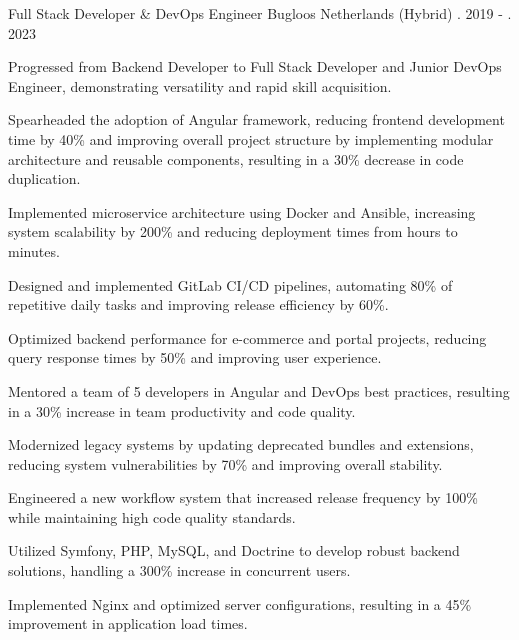 \begin{cventries}
    
  \cventry
    {Full Stack Developer \& DevOps Engineer} %
    {Bugloos} %
    {Netherlands (Hybrid)} %
    {\shortmonthname[08]. 2019 - \shortmonthname[08]. 2023} %
    {
      \begin{cvitems} %
        \item {Progressed from Backend Developer to Full Stack Developer and Junior DevOps Engineer, demonstrating versatility and rapid skill acquisition.}
        \item {Spearheaded the adoption of Angular framework, reducing frontend development time by 40\% and improving overall project structure by implementing modular architecture and reusable components, resulting in a 30\% decrease in code duplication.}
        \item {Implemented microservice architecture using Docker and Ansible, increasing system scalability by 200\% and reducing deployment times from hours to minutes.}
        \item {Designed and implemented GitLab CI/CD pipelines, automating 80\% of repetitive daily tasks and improving release efficiency by 60\%.}
        \item {Optimized backend performance for e-commerce and portal projects, reducing query response times by 50\% and improving user experience.}
        \item {Mentored a team of 5 developers in Angular and DevOps best practices, resulting in a 30\% increase in team productivity and code quality.}
        \item{Modernized legacy systems by updating deprecated bundles and extensions, reducing system vulnerabilities by 70\% and improving overall stability.}
        \item {Engineered a new workflow system that increased release frequency by 100\% while maintaining high code quality standards.}
        \item{Utilized Symfony, PHP, MySQL, and Doctrine to develop robust backend solutions, handling a 300\% increase in concurrent users.}
        \item{Implemented Nginx and optimized server configurations, resulting in a 45\% improvement in application load times.}
      \end{cvitems}
    }


\end{cventries}
